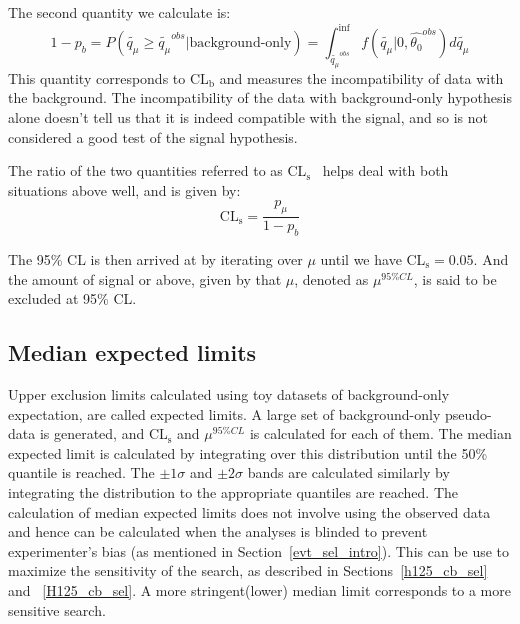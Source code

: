The second quantity we calculate is:
\begin{equation}                                                                                                                          
  \label{eq:pb}                                                     
  1-p_b=P(\tilde{q_\mu}\geq \tilde{q_\mu}^{obs}|\text{background-only})=\int_{\tilde{q_\mu}^{obs}}^{\inf}f(\tilde{q_\mu}|0,\hat{\theta_0}^{obs})d\tilde{q_\mu}                                                                                                            
\end{equation}
This quantity corresponds to CL$_\text{b}$ and measures the incompatibility of data with the background. The incompatibility of the data with background-only hypothesis alone doesn't tell us that it is indeed compatible with the signal, and so is not considered a good test of the signal hypothesis.

The ratio of the two quantities referred to as CL$_\text{s}$~\cite{cls1,cls2,cls3} helps deal with both situations above well, and is given by:
\begin{equation}                                                                                                                          
  \label{eq:cls}                                                                                                                           \text{CL}_\text{s}=\frac{p_\mu}{1-p_b}
\end{equation}

The 95\% CL is then arrived at by iterating over $\mu$ until we have CL$_\text{s}=0.05$. And the amount of signal or above, given by that $\mu$, denoted as $\mu^{95\%CL}$, is said to be excluded at 95\% CL. 

\subsection{Median expected limits}

Upper exclusion limits calculated using toy datasets of background-only expectation, are called expected limits. A large set of background-only pseudo-data is generated, and CL$_\text{s}$ and $\mu^{95\%CL}$ is calculated for each of them. The median expected limit is calculated by integrating over this distribution until the 50\% quantile is reached. The $\pm 1\sigma$ and $\pm 2\sigma$ bands are calculated similarly by integrating the distribution to the appropriate quantiles are reached. The calculation of median expected limits does not involve using the observed data and hence can be calculated when the analyses is blinded to prevent experimenter's bias (as mentioned in Section~\ref{evt_sel_intro}). This can be use to maximize the sensitivity of the search, as described in Sections~\ref{h125_cb_sel} and ~\ref{H125_cb_sel}. A more stringent(lower) median limit corresponds to a more sensitive search.  


